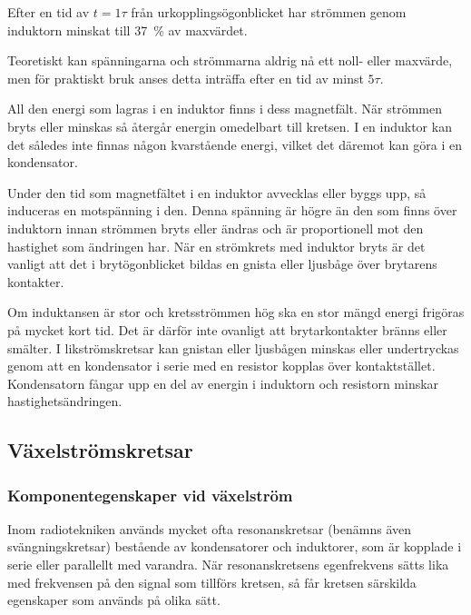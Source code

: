 \vspace*{1ex}

\noindent
Efter en tid av \(t = 1\tau\) från urkopplingsögonblicket har strömmen genom
induktorn minskat till \qty{37}{\percent} av maxvärdet.

Teoretiskt kan spänningarna och strömmarna aldrig nå ett noll- eller maxvärde,
men för praktiskt bruk anses detta inträffa efter en tid av minst \(5\tau\).

All den energi som lagras i en induktor finns i dess magnetfält.
När strömmen bryts eller minskas så återgår energin omedelbart till kretsen.
I en induktor kan det således inte finnas någon kvarstående energi, vilket
det däremot kan göra i en kondensator.

Under den tid som magnetfältet i en induktor avvecklas eller byggs upp, så
induceras en motspänning i den.
Denna spänning är högre än den som finns över induktorn innan strömmen bryts
eller ändras och är proportionell mot den hastighet som ändringen har.
När en strömkrets med induktor bryts är det vanligt att det i brytögonblicket
bildas en gnista eller ljusbåge över brytarens kontakter.

Om induktansen är stor och kretsströmmen hög ska en stor mängd energi frigöras
på mycket kort tid.
Det är därför inte ovanligt att brytarkontakter bränns eller smälter.
I likströmskretsar kan gnistan eller ljusbågen minskas eller undertryckas genom
att en kondensator i serie med en resistor kopplas över kontaktstället.
Kondensatorn fångar upp en del av energin i induktorn och resistorn minskar
hastighetsändringen.

\subsection{Växelströmskretsar}

\subsubsection{Komponentegenskaper vid växelström}

Inom radiotekniken används mycket ofta resonanskretsar (benämns även
svängningskretsar) bestående av kondensatorer och induktorer, som är kopplade i
serie eller parallellt med varandra.
När resonanskretsens egenfrekvens sätts lika med frekvensen på den signal som
tillförs kretsen, så får kretsen särskilda egenskaper som används på olika sätt.

